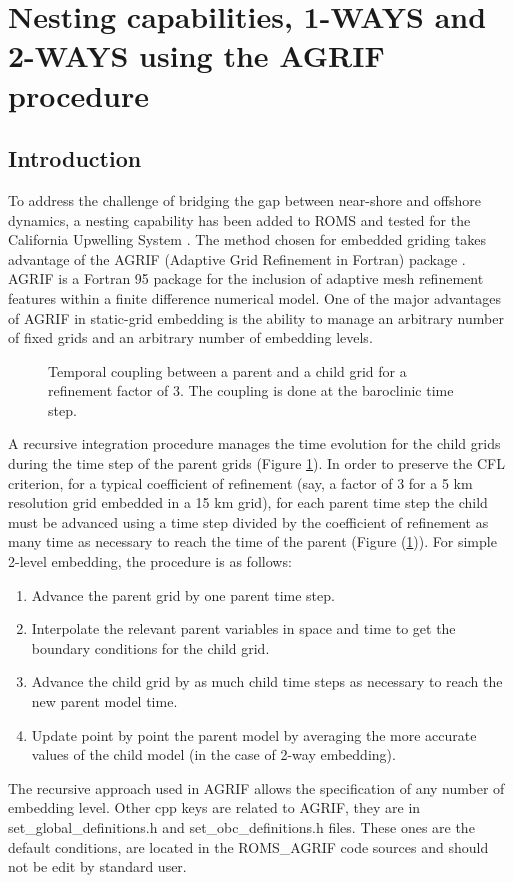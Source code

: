 \section{Nesting capabilities, 1-WAYS and 2-WAYS using the AGRIF procedure}

\subsection{Introduction}
\label{sec:introduction}

To address the challenge of bridging the gap between near-shore and offshore
dynamics, a nesting capability has been added to ROMS and tested for the California
Upwelling System \citep{Pen04}.  The method chosen for embedded griding takes
advantage of the AGRIF (Adaptive Grid Refinement in Fortran) package
\citep{Bla99,Deb00, Deb03a,Deb03b,Deb08}.  AGRIF is a Fortran 95 package for the
inclusion of adaptive mesh refinement features within a finite difference numerical
model. One of the major advantages of AGRIF in static-grid embedding is the ability
to manage an arbitrary number of fixed grids and an arbitrary number of embedding
levels.

\begin{figure}[htbp]
\centerline{}
\caption{Temporal coupling between a parent and a child grid for a refinement factor
  of 3.  The coupling is done at the baroclinic time step.}
\label{fig:temp_coupling}
\end{figure}

A recursive integration procedure manages the time evolution for the child grids
during the time step of the parent grids (Figure \ref{fig:temp_coupling}). In order
to preserve the CFL criterion, for a typical coefficient of refinement (say, a factor
of 3 for a 5 km resolution grid embedded in a 15 km grid), for each parent time step
the child must be advanced using a time step divided by the coefficient of refinement
as many time as necessary to reach the time of the parent (Figure
(\ref{fig:temp_coupling})).  For simple 2-level embedding, the
procedure is as follows:\\
\begin{enumerate}
\item Advance the parent grid by one parent time step.
\item Interpolate the relevant parent variables in space and time to get the boundary
  conditions for the child grid.
\item Advance the child grid by as much child time steps as necessary
to reach the new parent model time.
\item Update point by point the parent model by averaging the more accurate values of
  the child model (in the case of 2-way embedding).
\end{enumerate}
The recursive approach used in AGRIF allows the specification of any number of
embedding level. Other cpp keys are related to AGRIF, they are in
  set\_global\_definitions.h and set\_obc\_definitions.h files. These ones are the
  default conditions, are located in the ROMS\_AGRIF code sources and should not be
  edit by standard user.

